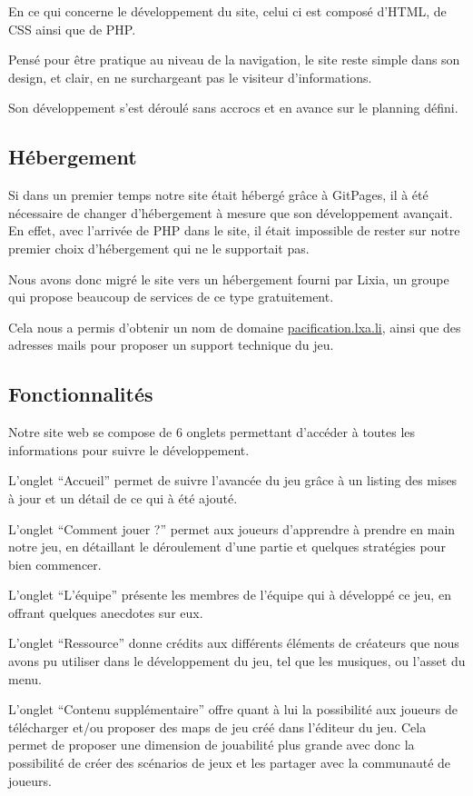 \documentclass[12pt]{report}
\begin{document}
En ce qui concerne le développement du site, celui ci est composé d’HTML, de CSS
ainsi que de PHP.

Pensé pour être pratique au niveau de la navigation, le site reste simple dans
son design, et clair, en ne surchargeant pas le visiteur d’informations. 

Son développement s’est déroulé sans accrocs et en avance sur le planning
défini.

\subsection{Hébergement}

Si dans un premier temps notre site était hébergé grâce à GitPages, il à été
nécessaire de changer d’hébergement à mesure que son développement avançait. En
effet, avec l’arrivée de PHP dans le site, il était impossible de rester sur
notre premier choix d'hébergement qui ne le supportait pas.

Nous avons donc migré le site vers un hébergement fourni par Lixia, un groupe
qui propose beaucoup de services de ce type gratuitement.

Cela nous a permis d’obtenir un nom de domaine \url{pacification.lxa.li}, ainsi
que des adresses mails pour proposer un support technique du jeu. 

\subsection{Fonctionnalités}

Notre site web se compose de 6 onglets permettant d'accéder à toutes les
informations pour suivre le développement.

L’onglet “Accueil” permet de suivre l’avancée du jeu grâce à un listing des
mises à jour et un détail de ce qui à été ajouté.

L’onglet “Comment jouer ?” permet aux joueurs d’apprendre à prendre en main
notre jeu, en détaillant le déroulement d’une partie et quelques stratégies pour
bien commencer.

L’onglet “L’équipe” présente les membres de l’équipe qui à développé ce jeu, en
offrant quelques anecdotes sur eux.

L’onglet “Ressource” donne crédits aux différents éléments de créateurs que nous
avons pu utiliser dans le développement du jeu, tel que les musiques, ou l’asset
du menu.

L’onglet “Contenu supplémentaire” offre quant à lui la possibilité aux joueurs
de télécharger et/ou proposer des maps de jeu créé dans l’éditeur du jeu. Cela
permet de proposer une dimension de jouabilité plus grande avec donc la
possibilité de créer des scénarios de jeux et les partager avec la communauté de
joueurs.
\end{document}
